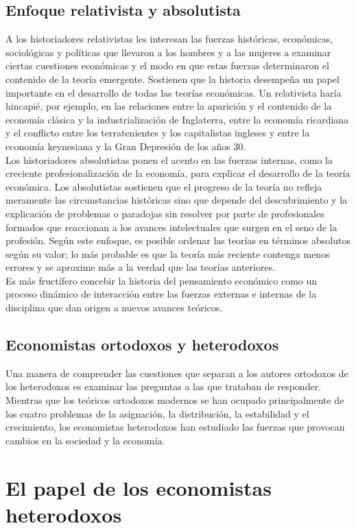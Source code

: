 \documentclass[10pt]{book}
\begin{document}
\subsection*{Enfoque relativista y absolutista}
A los historiadores relativistas les interesan las fuerzas históricas, económicas, sociológicas y políticas que llevaron a los hombres y a las mujeres a examinar ciertas cuestiones económicas y  el modo en que estas fuerzas determinaron el contenido de la teoría emergente. Sostienen que la historia desempeña un papel importante en el desarrollo de todas las teorías económicas. Un relativista haría hincapié, por ejemplo, en las relaciones entre la aparición y el contenido de la economía clásica y la industrialización de Inglaterra, entre la economía ricardiana y el conflicto entre los terratenientes y los capitalistas ingleses y entre la economía keynesiana y la Gran Depresión de los años 30.\\
Los historiadores absolutistas ponen el acento en las fuerzas internas, como la creciente profesionalización de la economía, para explicar el desarrollo de la teoría económica. Los absolutistas sostienen que el progreso de la teoría no refleja meramente las circunstancias históricas sino que depende del descubrimiento y la explicación de problemas o paradojas sin resolver por parte de profesionales formados que reaccionan a los avances intelectuales que surgen en el seno de la profesión. Según este enfoque, es posible ordenar las teorías en términos absolutos según su valor; lo más probable es que la teoría más reciente contenga menos errores y se aproxime más a la verdad que las teorías anteriores.\\
Es más fructífero concebir la historia del pensamiento económico como un proceso dinámico de interacción entre las fuerzas externas e internas de la disciplina que dan origen a nuevos avances teóricos.
\subsection*{Economistas ortodoxos y heterodoxos}
Una manera de comprender las cuestiones que separan a los autores ortodoxos de los heterodoxos es examinar las preguntas a las que trataban de responder. Mientras que los teóricos ortodoxos modernos se han ocupado principalmente de los cuatro problemas de la asignación, la distribución, la estabilidad y el crecimiento, los economistas heterodoxos han estudiado las fuerzas que provocan cambios en la sociedad y la economía.
\section*{El papel de los economistas heterodoxos}
\end{document}
